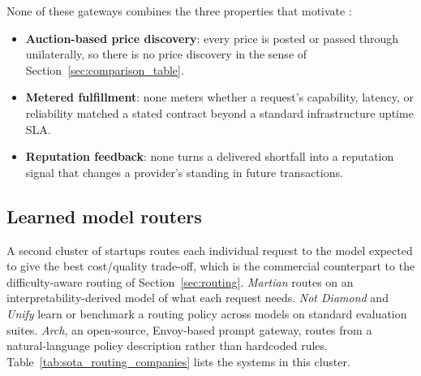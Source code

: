 None of these gateways combines the three properties that motivate
\NoesisMarket:

\begin{itemize}
  \item \textbf{Auction-based price discovery}: every price is posted or
    passed through unilaterally, so there is no price discovery in the
    sense of Section~\ref{sec:comparison_table}.
  \item \textbf{Metered fulfillment}: none meters whether a request's
    capability, latency, or reliability matched a stated contract beyond a
    standard infrastructure uptime SLA.
  \item \textbf{Reputation feedback}: none turns a delivered shortfall into
    a reputation signal that changes a provider's standing in future
    transactions.
\end{itemize}

\subsection{Learned model routers}
\label{sec:sota_routing}

A second cluster of startups routes each individual request to the model
expected to give the best cost/quality trade-off, which is the commercial
counterpart to the difficulty-aware routing of Section~\ref{sec:routing}.
\emph{Martian} routes on an interpretability-derived model of what each
request needs. \emph{Not Diamond} and \emph{Unify} learn or benchmark a
routing policy across models on standard evaluation suites. \emph{Arch},
an open-source, Envoy-based prompt gateway, routes from a natural-language
policy description rather than hardcoded rules.
Table~\ref{tab:sota_routing_companies} lists the systems in this cluster.

